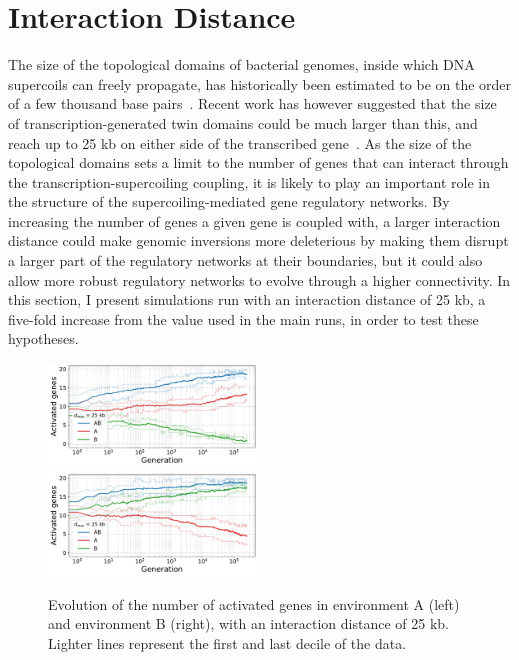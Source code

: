 \section{Interaction Distance}
\label{sec:param:inter25k}

The size of the topological domains of bacterial genomes, inside which DNA supercoils can freely propagate, has historically been estimated to be on the order of a few thousand base pairs~\citep{elhanafi2000,postow2004,kouzine2013}.
Recent work has however suggested that the size of transcription-generated twin domains could be much larger than this, and reach up to 25 kb on either side of the transcribed gene~\citep{visser2022}.
As the size of the topological domains sets a limit to the number of genes that can interact through the transcription-supercoiling coupling, it is likely to play an important role in the structure of the supercoiling-mediated gene regulatory networks.
By increasing the number of genes a given gene is coupled with, a larger interaction distance could make genomic inversions more deleterious by making them disrupt a larger part of the regulatory networks at their boundaries, but it could also allow more robust regulatory networks to evolve through a higher connectivity.
In this section, I present simulations run with an interaction distance of 25 kb, a five-fold increase from the value used in the main runs, in order to test these hypotheses.

\begin{figure}[H]
\centering
\includegraphics[width=0.495\textwidth]{param/interaction-25k/gene_activity_env_A.pdf}
\includegraphics[width=0.495\textwidth]{param/interaction-25k/gene_activity_env_B.pdf}
\caption[Evolution of the number of activated genes in each environment, with an interaction distance of 25 kb]{Evolution of the number of activated genes in environment A (left) and environment B (right), with an interaction distance of 25 kb.
Lighter lines represent the first and last decile of the data.}
\label{fig:param:inter25k-activ-by-env}
\end{figure}

